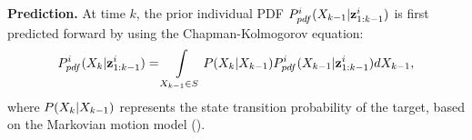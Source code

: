 	\textbf{Prediction.}
	At time $k$, the prior individual PDF $P^i_{pdf}(X_{k-1}|\mathbf{z}^i_{1:k-1})$ is first predicted forward by using the Chapman-Kolmogorov equation:
	\small
	\begin{equation}\label{eqn:bayes_pred}
	P^i_{pdf}(X_k|\mathbf{z}^i_{1:k-1})
	=\int\limits_{X_{k-1}\in S} P(X_k|X_{k-1})P^i_{pdf}(X_{k-1}|\mathbf{z}^i_{1:k-1})dX_{k-1},
	\end{equation}\normalsize
	where $P(X_k|X_{k-1})$ represents the state transition probability of the target, based on the Markovian motion model (). %
	
